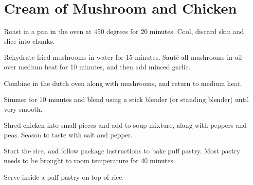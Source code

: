 
\section{Cream of Mushroom and Chicken}
\begin{recipe}



Roast in a pan in the oven at 450 degrees for 20 minutes. Cool, discard skin and slice into chunks.


Rehydrate fried mushrooms in water for 15 minutes.
Sauté all mushrooms in oil over medium heat for 10 minutes, and then add minced garlic.


Combine in the dutch oven along with mushrooms, and return to medium heat.

Simmer for 10 minutes and blend using a stick blender (or standing blender) until very smooth.


Shred chicken into small pieces and add to soup mixture, along with peppers and peas. Season to taste with salt and pepper.


Start the rice, and follow package instructions to bake puff pastry. Most pastry needs to be brought to room temperature for 40 minutes.

Serve inside a puff pastry on top of rice.

\end{recipe}
